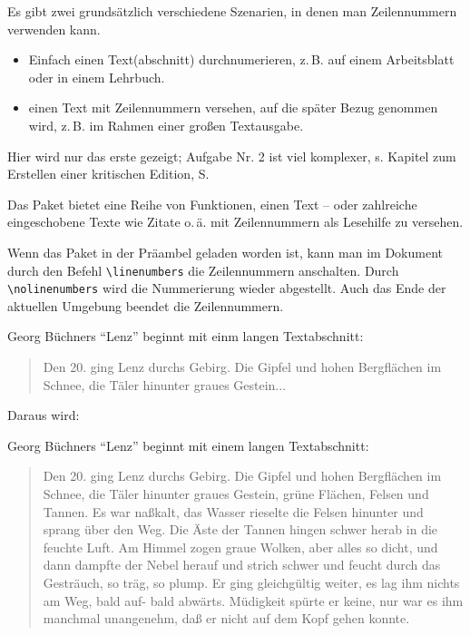 Es gibt zwei grundsätzlich verschiedene Szenarien, in denen man Zeilennummern verwenden
kann. 

\begin{itemize}
 \item Einfach einen Text(abschnitt) durchnumerieren, z.\,B. auf einem Arbeitsblatt oder in
 einem Lehrbuch.
 \item einen Text mit Zeilennummern versehen, auf die später Bezug genommen wird, 
 z.\,B. im Rahmen einer großen Textausgabe. 
\end{itemize}

Hier wird nur das erste gezeigt;
Aufgabe Nr. 2 ist viel komplexer, s. Kapitel zum Erstellen einer kritischen Edition, 
S.~\pageref{reledmac} 

Das Paket  bietet eine Reihe von Funktionen, einen Text -- oder 
zahlreiche eingeschobene Texte wie Zitate o.\,ä. mit Zeilennummern als Lesehilfe zu 
versehen.



Wenn das Paket  in der Präambel geladen worden ist, kann man im
Dokument durch den Befehl \lstinline/\linenumbers/ die Zeilennummern anschalten.
Durch \lstinline/\nolinenumbers/ wird die Nummerierung wieder abgestellt.
Auch das Ende der aktuellen Umgebung beendet die Zeilennummern.

\begin{lfgwcode}{}
 Georg Büchners \enquote{Lenz} beginnt mit einm langen Textabschnitt:
 
 \begin{quotation}
 \modulolinenumbers[5]
 \linenumbers
 Den 20. ging Lenz durchs Gebirg. Die Gipfel und hohen Bergflächen im Schnee, die Täler
 hinunter graues Gestein...
 \end{quotation}
\end{lfgwcode}

Daraus wird:
\bigskip

 Georg Büchners \enquote{Lenz} beginnt mit einem langen Textabschnitt:

 \begin{quotation}
 \modulolinenumbers[5]
 \linenumbers
 Den 20. ging Lenz durchs Gebirg. Die Gipfel und hohen Bergflächen im Schnee, die Täler
 hinunter graues Gestein, grüne Flächen, Felsen und Tannen. Es war naßkalt, das Wasser
 rieselte die Felsen hinunter und sprang über den Weg. Die Äste der Tannen hingen schwer
 herab in die feuchte Luft. Am Himmel zogen graue Wolken, aber alles so dicht, und dann 
 dampfte der Nebel herauf und strich schwer und feucht durch das Gesträuch, so träg,
 so plump. Er ging gleichgültig weiter, es lag ihm nichts am Weg, bald auf- bald
 abwärts. Müdigkeit spürte er keine, nur war es ihm manchmal unangenehm, daß er nicht
 auf dem Kopf gehen konnte.
 \end{quotation}

